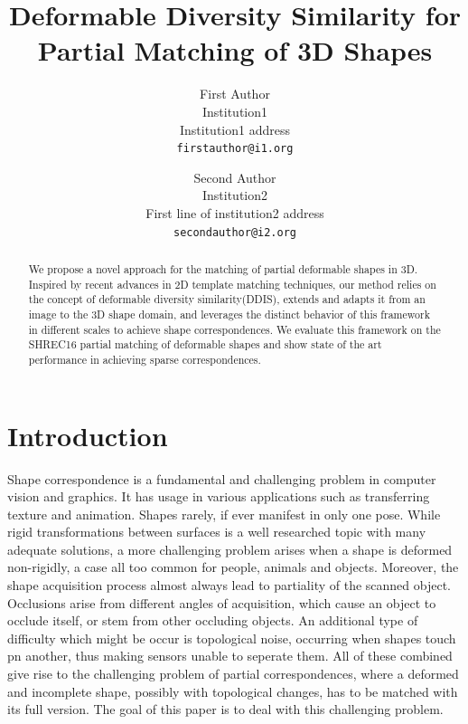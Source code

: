 \documentclass[10pt,twocolumn,letterpaper]{article}
\begin{document}
\title{Deformable Diversity Similarity for Partial Matching of 3D Shapes}

\author{First Author\\
Institution1\\
Institution1 address\\
{\tt\small firstauthor@i1.org}
\and
Second Author\\
Institution2\\
First line of institution2 address\\
{\tt\small secondauthor@i2.org}
}

\maketitle

\begin{abstract}
We propose a novel approach for the matching of partial deformable shapes in 3D. Inspired by recent advances in 2D template matching techniques, our method relies on the concept of deformable diversity similarity(DDIS), extends and adapts it from an image to the 3D shape domain, and leverages the distinct behavior of this framework in different scales to achieve shape correspondences. We evaluate this framework on the SHREC16 partial matching of deformable shapes and show state of the art performance in achieving sparse correspondences.
\end{abstract}

\section{Introduction}

Shape correspondence is a fundamental and challenging problem in computer vision and graphics. It has usage in various applications such as transferring texture and animation. 
Shapes rarely, if ever manifest in only one pose. While rigid transformations between surfaces is a well researched topic with many adequate solutions, a more challenging problem arises when a shape is deformed non-rigidly, a case all too common for people, animals and objects.
Moreover, the shape acquisition process almost always lead to partiality of the scanned object. Occlusions arise from different angles of acquisition, which cause an object to occlude itself, or stem from other occluding objects. 
An additional type of difficulty which might be occur is topological noise, occurring when shapes touch pn another, thus making  sensors unable to seperate them.
All of these combined give rise to the challenging problem of partial correspondences, where a deformed and incomplete shape, possibly with topological changes, has to be matched with its full version. The goal of this paper is to deal with this challenging problem.
\end{document}
